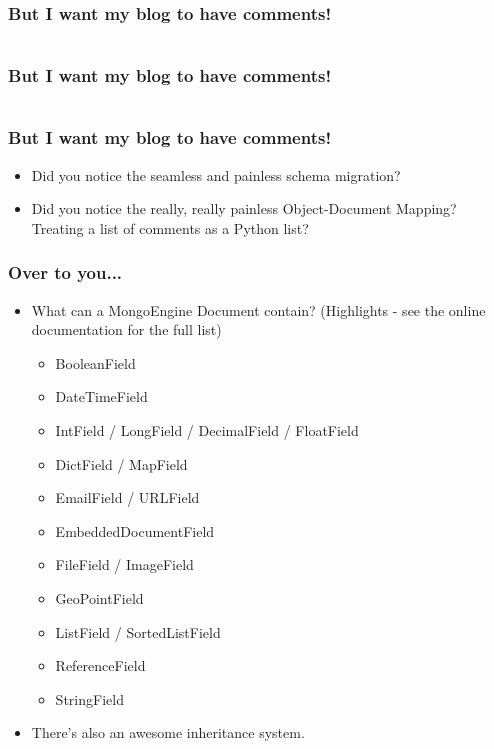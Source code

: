 \documentclass{beamer}
\begin{document}
\begin{frame}
  \frametitle{But I want my blog to have comments!}
  \inputminted[firstline=33,lastline=44]{python}{../steps/02-database/comment_example.py}
\end{frame}

\begin{frame}
  \frametitle{But I want my blog to have comments!}
  \inputminted[firstline=46,lastline=59]{python}{../steps/02-database/comment_example.py}
\end{frame}

\begin{frame}
  \frametitle{But I want my blog to have comments!}
  \begin{itemize}
  \item Did you notice the seamless and painless schema migration?
  \item Did you notice the really, really painless Object-Document
    Mapping? Treating a list of comments as a Python list?
  \end{itemize}
\end{frame}

\begin{frame}
  \frametitle{Over to you...}
  \begin{itemize}
  \item What can a MongoEngine Document contain? (Highlights - see
    the online documentation for the full list)
    \begin{itemize}
    \item BooleanField
    \item DateTimeField
    \item IntField / LongField / DecimalField / FloatField
    \item DictField / MapField
    \item EmailField / URLField
    \item EmbeddedDocumentField
    \item FileField / ImageField
    \item GeoPointField
    \item ListField / SortedListField
    \item ReferenceField
    \item StringField
    \end{itemize}
  \item There's also an awesome inheritance system.
  \end{itemize}
\end{frame}
\end{document}
